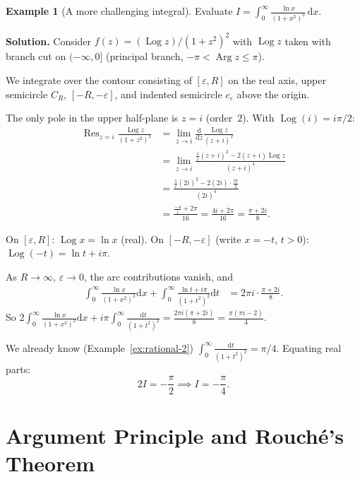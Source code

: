 \documentclass[12pt,a4paper,openany]{book}
\theoremstyle{definition}
\newtheorem{example}[definition]{Example}
\theoremstyle{plain}
\theoremstyle{remark}
\DeclareMathOperator{\Arg}{Arg}
\DeclareMathOperator{\Log}{Log}
\DeclareMathOperator{\Res}{Res}
\newcommand{\dd}{\mathrm{d}}
\begin{document}
\begin{example}[A more challenging integral]\label{ex:extra-3}
Evaluate $\displaystyle I=\int_0^{\infty}\frac{\ln x}{(1+x^2)^2}\,\dd x$.

\medskip\noindent\textbf{Solution.}
Consider $f(z)=(\Log z)/(1+z^2)^2$ with $\Log z$ taken with branch cut
on $(-\infty,0]$ (principal branch, $-\pi<\Arg z\leq\pi$).

We integrate over the contour consisting of $[\varepsilon,R]$ on the
real axis, upper semicircle $C_R$, $[-R,-\varepsilon]$, and indented
semicircle $c_\varepsilon$ above the origin.

The only pole in the upper half-plane is $z=i$ (order~$2$).  With
$\Log(i)=i\pi/2$:
\begin{align*}
  \Res_{z=i}\frac{\Log z}{(1+z^2)^2}
  &=\lim_{z\to i}\frac{\dd}{\dd z}\frac{\Log z}{(z+i)^2} \\
  &=\lim_{z\to i}\frac{\frac{1}{z}(z+i)^2-2(z+i)\Log z}{(z+i)^4} \\
  &=\frac{\frac{1}{i}(2i)^2-2(2i)\cdot\frac{i\pi}{2}}{(2i)^4} \\
  &=\frac{\frac{-4}{i}+2\pi}{16}
  =\frac{4i+2\pi}{16}
  =\frac{\pi+2i}{8}.
\end{align*}

On $[\varepsilon,R]$: $\Log x=\ln x$ (real).
On $[-R,-\varepsilon]$ (write $x=-t$, $t>0$): $\Log(-t)=\ln t+i\pi$.

As $R\to\infty$, $\varepsilon\to 0$, the arc contributions vanish, and
\begin{align*}
  \int_0^{\infty}\frac{\ln x}{(1+x^2)^2}\dd x
  +\int_0^{\infty}\frac{\ln t+i\pi}{(1+t^2)^2}\dd t
  &=2\pi i\cdot\frac{\pi+2i}{8}.
\end{align*}
So $2\int_0^{\infty}\frac{\ln x}{(1+x^2)^2}\dd x
+i\pi\int_0^{\infty}\frac{\dd t}{(1+t^2)^2}
=\frac{2\pi i(\pi+2i)}{8}=\frac{\pi(\pi i-2)}{4}$.

We already know (Example~\ref{ex:rational-2})
$\int_0^{\infty}\frac{\dd t}{(1+t^2)^2}=\pi/4$.
Equating real parts:
\[
  2I = -\frac{\pi}{2} \implies
  I = -\frac{\pi}{4}.
\]
\end{example}

\section{Argument Principle and Rouch\'e's Theorem}\label{sec:argument-principle}
\end{document}
